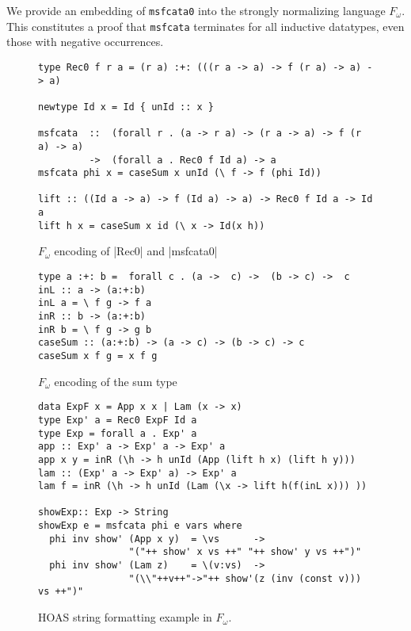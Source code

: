 \documentclass[letterpaper,12pt]{article}
\begin{document}
We provide an embedding of \verb|msfcata0|
into the strongly normalizing language $F_\omega$.
This constitutes a proof that \verb|msfcata| terminates for all
inductive datatypes, even those with negative occurrences.

\begin{figure}
\begin{verbatim}
type Rec0 f r a = (r a) :+: (((r a -> a) -> f (r a) -> a) -> a)

newtype Id x = Id { unId :: x }

msfcata  ::  (forall r . (a -> r a) -> (r a -> a) -> f (r a) -> a)
         ->  (forall a . Rec0 f Id a) -> a
msfcata phi x = caseSum x unId (\ f -> f (phi Id))

lift :: ((Id a -> a) -> f (Id a) -> a) -> Rec0 f Id a -> Id a
lift h x = caseSum x id (\ x -> Id(x h))
\end{verbatim}
\caption{$F_\omega$ encoding of |Rec0| and |msfcata0|}
\label{fig:proofsf}
\end{figure}

\begin{figure}
\begin{verbatim}
type a :+: b =  forall c . (a ->  c) ->  (b -> c) ->  c
inL :: a -> (a:+:b)
inL a = \ f g -> f a
inR :: b -> (a:+:b)
inR b = \ f g -> g b
caseSum :: (a:+:b) -> (a -> c) -> (b -> c) -> c
caseSum x f g = x f g
\end{verbatim}
\caption{$F_\omega$ encoding of the sum type}
\label{fig:sumdef}
\end{figure}

\begin{figure}
\begin{verbatim}
data ExpF x = App x x | Lam (x -> x)
type Exp' a = Rec0 ExpF Id a
type Exp = forall a . Exp' a
app :: Exp' a -> Exp' a -> Exp' a
app x y = inR (\h -> h unId (App (lift h x) (lift h y)))
lam :: (Exp' a -> Exp' a) -> Exp' a
lam f = inR (\h -> h unId (Lam (\x -> lift h(f(inL x))) ))

showExp:: Exp -> String
showExp e = msfcata phi e vars where
  phi inv show' (App x y)  = \vs      ->
                "("++ show' x vs ++" "++ show' y vs ++")"
  phi inv show' (Lam z)    = \(v:vs)  ->
                "(\\"++v++"->"++ show'(z (inv (const v))) vs ++")"
\end{verbatim}

\caption{HOAS string formatting example in $F_\omega$.}
\label{fig:HOASshowFw}
\end{figure}
\end{document}
